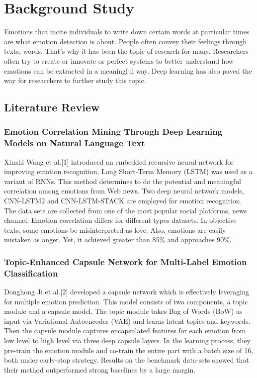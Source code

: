 \chapter{Background Study} \label{ch:literature_review}


Emotions that incite individuals to write down certain words at particular times are what emotion detection is about. People often convey their feelings through texts, words. That's why it has been the topic of research for many. Researchers often try to create or innovate or perfect systems to better understand how emotions can be extracted in a meaningful way. Deep learning has also paved the way for researchers to further study this topic.
\section{Literature Review}

\subsection{Emotion Correlation Mining Through Deep Learning Models on Natural Language Text}
Xinzhi Wang et al.[1] introduced an embedded recursive neural network for improving emotion recognition, Long Short-Term Memory (LSTM) was used as a variant of RNNs. This method determines to do the potential and meaningful correlation among emotions from Web news. Two deep neural network models, CNN-LSTM2 and CNN-LSTM-STACK are employed for emotion recognition. The data sets are collected from one of the most popular social platforms, news channel. Emotion correlation differs for different types datasets. In objective texts, some emotions be misinterpreted as love. Also, emotions are easily mistaken as anger. Yet, it achieved greater than 85\% and approaches 90\%.


\subsection{Topic-Enhanced Capsule Network for Multi-Label Emotion Classification}
Donghong Ji et al.[2] developed a capsule network which is effectively leveraging for multiple emotion prediction. This model consists of two components, a topic module and a capsule model. The topic module takes Bag of Words (BoW) as input via Variational Autoencoder (VAE) and learns latent topics and keywords. Then the capsule module captures encapsulated features for each emotion from low level to high level via three deep capsule layers. In the learning process, they pre-train the emotion module and co-train the entire part with a batch size of 16, both under early-stop strategy. Results on the benchmark data-sets showed that their method outperformed strong baselines by a large margin.



